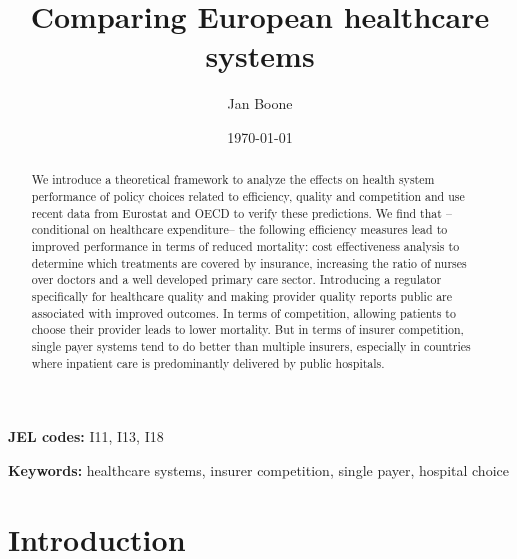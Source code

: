 \documentclass[12pt,english,a4paper]{article}
\author{Jan Boone\inst{*}}
\date{\today}
\title{Comparing European healthcare systems}
\begin{document}
\maketitle
\begin{PREFACE}
\maketitle
\end{PREFACE}


\begin{abstract}
We introduce a theoretical framework to analyze the effects on health system performance of policy choices related to efficiency, quality and competition and use recent data from Eurostat and OECD to verify these predictions. We find that --conditional on healthcare expenditure-- the following efficiency measures lead to improved performance in terms of reduced mortality: cost effectiveness analysis to determine which treatments are covered by insurance, increasing the ratio of nurses over doctors and a well developed primary care sector. Introducing a regulator specifically for healthcare quality and making provider quality reports public are associated with improved outcomes. In terms of competition, allowing patients to choose their provider leads to lower mortality. But in terms of insurer competition, single payer systems tend to do better than multiple insurers, especially in countries where inpatient care is predominantly delivered by public hospitals.
\end{abstract}

\textbf{JEL codes:} I11, I13, I18

\textbf{Keywords:} healthcare systems, insurer competition, single payer, hospital choice


\vspace*{\fill}

\newpage

\section{Introduction}
\label{sec:org010cb5e}
\end{document}
